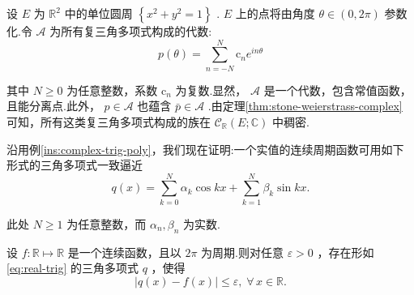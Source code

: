 \begin{instance}[复三角多项式]\label{ins:complex-trig-poly}
设 $E$ 为 ${\mathbb{R}}^{2}$ 中的单位圆周 $\left\{  {{x}^{2} + {y}^{2} = 1}\right\}$ . $E$ 上的点将由角度 $\theta  \in  \left(  {0,{2\pi }}\right)$ 参数化.令 $\mathcal{A}$ 为所有复三角多项式构成的代数:
\begin{equation}\tag{3.5}\label{eq:complex-trig}
p\left( \theta \right)  = \mathop{\sum }\limits_{{n =  - N}}^{N}{\mathrm{c}}_{n}{e}^{in\theta }
\end{equation}

其中 $N \geq  0$ 为任意整数，系数 ${\mathrm{c}}_{n}$ 为复数.显然， $\mathcal{A}$ 是一个代数，包含常值函数，且能分离点.此外， $p \in  \mathcal{A}$ 也蕴含 $\bar{p} \in  \mathcal{A}$ .由定理\ref{thm:stone-weierstrass-complex} 可知，所有这类复三角多项式构成的族在 ${\mathcal{C}}_{\mathbb{R}}\left( {E;\mathbb{C}}\right)$ 中稠密.
\end{instance}

沿用例\ref{ins:complex-trig-poly}，我们现在证明:一个实值的连续周期函数可用如下形式的三角多项式一致逼近
\begin{equation}\tag{3.6}\label{eq:real-trig}
q\left( x\right)  = \mathop{\sum }\limits_{{k = 0}}^{N}{\alpha }_{k}\cos {kx} + \mathop{\sum }\limits_{{k = 1}}^{N}{\beta }_{k}\sin {kx}.
\end{equation}

此处 $N \geq  1$ 为任意整数，而 ${\alpha }_{n},{\beta }_{n}$ 为实数.

\begin{corollary}[三角多项式对周期函数的逼近]\label{cor:trig-approx-periodic}
设 $f : \mathbb{R} \mapsto  \mathbb{R}$ 是一个连续函数，且以 ${2\pi }$ 为周期.则对任意 $\varepsilon  > 0$ ，存在形如 \eqref{eq:real-trig} 的三角多项式 $q$ ，使得
\begin{equation}\tag{3.7}\label{eq:trig-approx-bound}
\left| {q\left( x\right)  - f\left( x\right) }\right|  \leq  \varepsilon ,\;\forall\,x \in  \mathbb{R}.
\end{equation}
\end{corollary}

